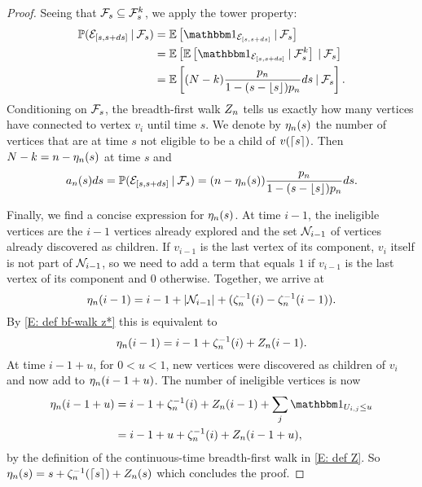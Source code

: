 \begin{proof}
	Seeing that $\mathcal{F}_s \subseteq \mathcal{F}_s^k$,
	we apply the tower property:
	\begin{equation}
	\begin{aligned}
	\Prob(\NewEdge{[s,s+ds]} \cond \SigmaAlgebra_s)
	&= \ExpBig{\Ind{\NewEdge{[s,s+ds]}} \cond \SigmaAlgebra_s} \\
	&= \ExpBig{ \ExpBig{\Ind{\NewEdge{[s,s+ds]}} \cond \SigmaAlgebra_s^k} \cond \SigmaAlgebra_s} \\
	&= \ExpBig{ (N-k) \ps ds \cond \SigmaAlgebra_s}.
	\end{aligned}
	\end{equation}
	Conditioning on $\mathcal{F}_s$,
	the breadth-first walk $Z_n$ tells us exactly how many vertices have connected to vertex $v_i$ until time $s$.
	We denote by $\eta_n(s)$ the number of vertices that are at time $s$ not eligible to be a child of $v(\lceil s\rceil)$. \label{I: eta}
	Then $N-k=n-\eta_n(s)$ at time $s$ and
	\begin{equation}
	a_n(s)ds = \mathbb{P}(\mathcal{E}_{[s, s+ds]} \: | \: \mathcal{F}_s) = (n - \eta_n(s)) \frac{p_n}{1-(s-\lfloor s\rfloor)p_n} ds.
	\end{equation}
	
	\bigskip
	
	Finally, we find a concise expression for $\eta_n(s)$.
	At time $i-1$, the ineligible vertices are the $i-1$ vertices already explored
	and the set $\mathcal{N}_{i-1}$ of vertices already discovered as children.
	If $v_{i-1}$ is the last vertex of its component,
	$v_i$ itself is not part of $\mathcal{N}_{i-1}$, 
	so we need to add a term that equals $1$ if $v_{i-1}$ is the last vertex of its component and $0$ otherwise.
	Together, we arrive at
	\begin{equation}
	\eta_n(i-1) = i-1 + |\mathcal{N}_{i-1}| + (\zeta^{-1}_n(i) - \zeta^{-1}_n(i-1)).
	\end{equation}
	By \eqref{E: def bf-walk z*} this is equivalent to
	\begin{equation}
	\eta_n(i-1) = i-1 + \zeta^{-1}_n(i) + Z_n(i-1).
	\end{equation}
	At time $i-1+u$, for $0<u<1$, 
	new vertices were discovered as children of $v_i$ and now add to $\eta_n(i-1+u)$.
	The number of ineligible vertices is now
	\begin{equation}
	\begin{aligned}
	\Ineligible{i-1+u} 
	&= i-1 + \ZetaMinus{i} + \Zn(i-1) + \sum_{j} \Ind{\Uij \leq u} \\
	&= i-1+u + \ZetaMinus{i} + \Zn(i-1+u),
	\end{aligned}
	\end{equation} 
	by the definition of the continuous-time breadth-first walk in \eqref{E: def Z}.
	So $\eta_n(s) = s + \zeta^{-1}_n(\lceil s\rceil) + Z_n(s)$ which concludes the proof.
\end{proof}

